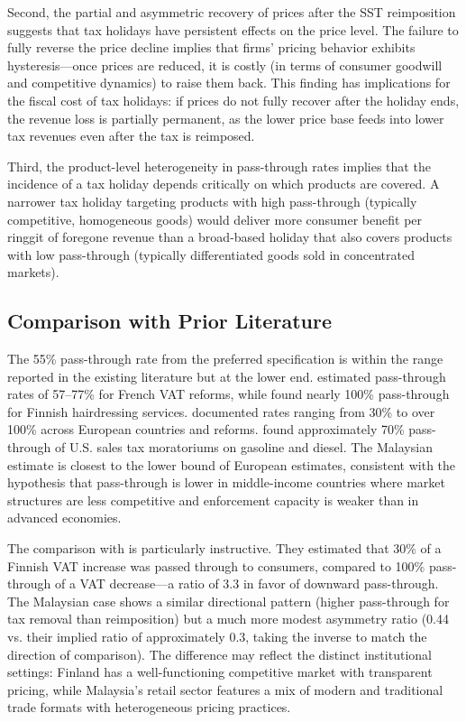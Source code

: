 \documentclass[12pt]{article}
\begin{document}
Second, the partial and asymmetric recovery of prices after the SST reimposition suggests that tax holidays have persistent effects on the price level. The failure to fully reverse the price decline implies that firms' pricing behavior exhibits hysteresis---once prices are reduced, it is costly (in terms of consumer goodwill and competitive dynamics) to raise them back. This finding has implications for the fiscal cost of tax holidays: if prices do not fully recover after the holiday ends, the revenue loss is partially permanent, as the lower price base feeds into lower tax revenues even after the tax is reimposed.

Third, the product-level heterogeneity in pass-through rates implies that the incidence of a tax holiday depends critically on which products are covered. A narrower tax holiday targeting products with high pass-through (typically competitive, homogeneous goods) would deliver more consumer benefit per ringgit of foregone revenue than a broad-based holiday that also covers products with low pass-through (typically differentiated goods sold in concentrated markets).

\subsection{Comparison with Prior Literature}

The 55\% pass-through rate from the preferred specification is within the range reported in the existing literature but at the lower end. \citet{carbonnier2007} estimated pass-through rates of 57--77\% for French VAT reforms, while \citet{kosonen2015} found nearly 100\% pass-through for Finnish hairdressing services. \citet{benedek2020} documented rates ranging from 30\% to over 100\% across European countries and reforms. \citet{doyle2008} found approximately 70\% pass-through of U.S. sales tax moratoriums on gasoline and diesel. The Malaysian estimate is closest to the lower bound of European estimates, consistent with the hypothesis that pass-through is lower in middle-income countries where market structures are less competitive and enforcement capacity is weaker than in advanced economies.

The comparison with \citet{benzarti2020} is particularly instructive. They estimated that 30\% of a Finnish VAT increase was passed through to consumers, compared to 100\% pass-through of a VAT decrease---a ratio of 3.3 in favor of downward pass-through. The Malaysian case shows a similar directional pattern (higher pass-through for tax removal than reimposition) but a much more modest asymmetry ratio (0.44 vs. their implied ratio of approximately 0.3, taking the inverse to match the direction of comparison). The difference may reflect the distinct institutional settings: Finland has a well-functioning competitive market with transparent pricing, while Malaysia's retail sector features a mix of modern and traditional trade formats with heterogeneous pricing practices.
\end{document}
